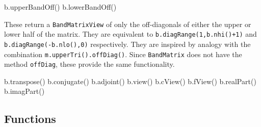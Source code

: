 \documentclass[twoside,letterpaper,11pt]{article}
\renewcommand{\tt}[1]{{\lstinline {#1}}}
\begin{document}
\begin{tmvcode}
b.upperBandOff()
b.lowerBandOff()
\end{tmvcode}
These return a \tt{BandMatrixView} of only the off-diagonals of either the
upper or lower half of the matrix.  They are equivalent to
\tt{b.diagRange(1,b.nhi()+1)} and \tt{b.diagRange(-b.nlo(),0)} respectively.  
They are inspired by analogy with the combination \tt{m.upperTri().offDiag()}.
Since \tt{BandMatrix} does not have the method \tt{offDiag}, these provide
the same functionality.

\begin{tmvcode}
b.transpose()
b.conjugate()
b.adjoint()
b.view()
b.cView()
b.fView()
b.realPart()
b.imagPart()
\end{tmvcode}
\vspace{12pt}

\subsection{Functions}
\label{BandMatrix_Functions}
\end{document}
